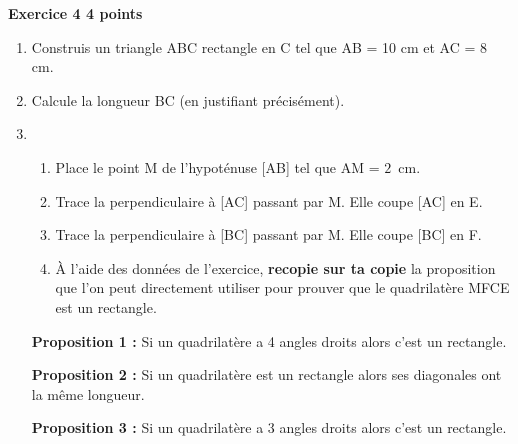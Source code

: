 \textbf{Exercice 4 \hfill 4 points}

\medskip

\begin{enumerate}
\item Construis un triangle ABC rectangle en C tel que AB = 10 cm et AC = 8 cm. 
\item Calcule la longueur BC (en justifiant précisément). 
\item 
	\begin{enumerate}
		\item Place le point M de l'hypoténuse [AB] tel que AM = $2$~cm. 
		\item Trace la perpendiculaire à [AC] passant par M. Elle coupe [AC] en E. 
		\item Trace la perpendiculaire à [BC] passant par M. Elle coupe [BC] en F. 
		\item À l'aide des données de l'exercice, \textbf{recopie sur ta copie} la proposition que l'on peut directement utiliser pour prouver que le quadrilatère MFCE est un rectangle.
	\end{enumerate}

\medskip
	 
\textbf{Proposition 1 :} Si un quadrilatère a 4 angles droits alors c'est un rectangle. 

\textbf{Proposition 2 :} Si un quadrilatère est un rectangle alors ses diagonales ont la même longueur. 

\textbf{Proposition 3 :} Si un quadrilatère a 3 angles droits alors c'est un rectangle. 

\end{enumerate}

\bigskip

